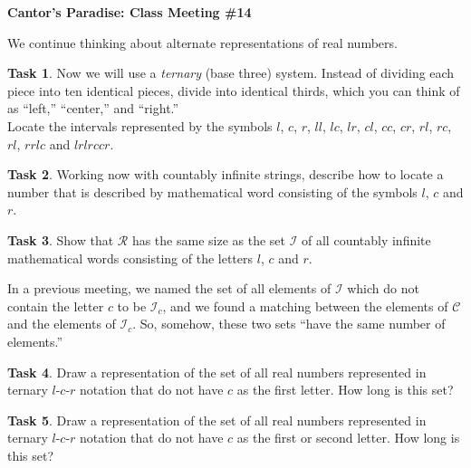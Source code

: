\documentclass[12pt]{amsart}
\theoremstyle{definition}
\newtheorem{task}{Task}
\begin{document}
\begin{center}
\textbf{\Huge
Cantor's Paradise: Class Meeting \#14
}
\end{center}


\vspace{.5in}


We continue thinking about alternate representations of real numbers. \\

\begin{task}
Now we will use a \emph{ternary} (base three) system. Instead of dividing each piece into ten identical pieces, divide into identical thirds, which you can think of as ``left,'' ``center,'' and ``right.'' \\
Locate the intervals represented by the symbols $l$, $c$, $r$, $ll$, $lc$, $lr$, $cl$, $cc$, $cr$, $rl$, $rc$, $rl$, $rrlc$ and $lrlrccr$. \\
\end{task}

\begin{task} Working now with countably infinite strings, describe how to locate a number that is described by mathematical word consisting of the symbols $l$, $c$ and $r$.\\
\end{task}

\begin{task} Show that $\mathcal{R}$ has the same size as the set $\mathcal{I}$ of all countably infinite mathematical words consisting of the letters $l$, $c$ and $r$.\\
\end{task}

In a previous meeting, we named the set of all elements of $\mathcal{I}$ which do not contain the letter $c$ to be $\mathcal{I}_c$, and we found a matching between the elements of $\mathcal{C}$ and the elements of $\mathcal{I}_c$. So, somehow, these two sets ``have the same number of elements.''\\

\begin{task} Draw a representation of the set of all real numbers represented in ternary $l$-$c$-$r$ notation that do not have $c$ as the first letter. How long is this set?\\
\end{task}

\begin{task} Draw a representation of the set of all real numbers represented in ternary $l$-$c$-$r$ notation that do not have $c$ as the first or second letter. How long is this set? \\
\end{task}
\end{document}
